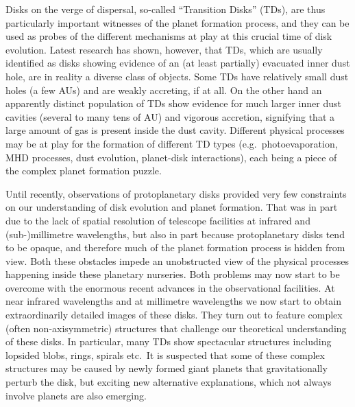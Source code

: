 \documentclass[10pt,fleqn,twoside,a4paper]{article}
\begin{document}
Disks on the verge of dispersal, so-called ``Transition Disks'' (TDs),  are thus particularly important
witnesses of the planet formation process, and they can be used
as probes of the different mechanisms at play at this crucial time of
disk evolution. Latest research has shown, however, that TDs, which are usually
identified as disks showing evidence of an (at least partially)
evacuated inner dust hole, are in reality a diverse class of
objects. Some TDs have relatively small dust holes (a few AUs) and are
weakly accreting, if at all. On the other hand an apparently distinct
population of TDs show evidence for much larger inner dust cavities
(several to many tens of AU) and vigorous accretion, signifying that a
large amount of gas is present inside the dust cavity. Different
physical processes may be at play for the formation of different TD
types (e.g.\ photoevaporation, MHD processes, dust evolution, planet-disk interactions),
each being a piece of the complex planet formation puzzle. 

Until recently, observations of protoplanetary disks provided very few
constraints on our understanding of disk evolution and planet formation. That was in part due
to the lack of spatial resolution of telescope facilities at infrared and
(sub-)millimetre wavelengths, but also in part because protoplanetary disks
tend to be opaque, and therefore much of the planet formation process is
hidden from view. Both these obstacles impede an unobstructed view of the
physical processes happening inside these planetary nurseries. Both problems may now start to
be overcome with the enormous recent advances in the observational
facilities. At near infrared wavelengths and at millimetre wavelengths we
now start to obtain extraordinarily detailed images of these disks. They
turn out to feature complex (often non-axisymmetric) structures that
challenge our theoretical understanding of these disks. In particular,
many TDs show spectacular structures including lopsided blobs, rings,
spirals etc.\ It is suspected 
that some of these complex structures may be caused by newly formed giant
planets that gravitationally perturb the disk, but exciting new
alternative explanations, which not always involve planets are also emerging. 
\end{document}
